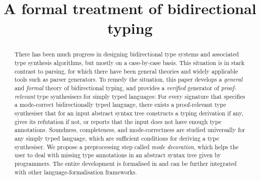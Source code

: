 \documentclass[orivec,envcountsame,envcountsect,oribibl]{llncs}
\title{A formal treatment of bidirectional typing}
\begin{document}
\maketitle

\begin{abstract}
There has been much progress in designing bidirectional type systems and associated type synthesis algorithms, but mostly on a case-by-case basis.
This situation is in stark contrast to parsing, for which there have been general theories and widely applicable tools such as parser generators.
To remedy the situation, this paper develops a \emph{general} and \emph{formal} theory of bidirectional typing, and provides a \emph{verified} generator of \emph{proof-relevant} type synthesisers for simply typed languages: For every signature that specifies a mode-correct bidirectionally typed language, there exists a proof-relevant type synthesiser that for an input abstract syntax tree constructs a typing derivation if any, gives its refutation if not, or reports that the input does not have enough type annotations.
Soundness, completeness, and mode-correctness are studied universally for any simply typed language, which are sufficient conditions for deriving a type synthesiser.
We propose a preprocessing step called \emph{mode decoration}, which helps the user to deal with missing type annotations in an abstract syntax tree given by programmers.
The entire development is formalised in \Agda and can be further integrated with other language-formalisation frameworks.
\end{abstract}









\appendix





\end{document}
